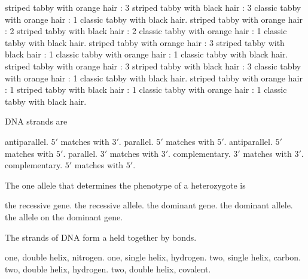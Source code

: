 \begin{choices}
 striped tabby with orange hair : 3 striped tabby with black hair : 3 classic tabby with orange hair : 1 classic tabby with black hair. %
 striped tabby with orange hair : 2 striped tabby with black hair : 2 classic tabby with orange hair : 1 classic tabby with black hair.%
 striped tabby with orange hair : 3 striped tabby with black hair : 1 classic tabby with orange hair : 1 classic tabby with black hair.%
 striped tabby with orange hair : 3 striped tabby with black hair : 3 classic tabby with orange hair : 1 classic tabby with black hair.%
 striped tabby with orange hair : 1 striped tabby with black hair : 1 classic tabby with orange hair : 1 classic tabby with black hair.%
\end{choices}


\question
DNA strands are

\begin{choices}
\correctchoice antiparallel. $5'$ matches with $3'$.%
\choice parallel. $5'$ matches with $5'$.%
\choice antiparallel. $5'$ matches with $5'$.%
\choice parallel. $3'$ matches with $3'$.%
\choice complementary. $3'$ matches with $3'$.%
\choice complementary. $5'$ matches with $5'$.%
\end{choices}


\question
The one allele that determines the phenotype of a heterozygote is

\begin{choices}
\choice the recessive gene.%
\choice the recessive allele.%
\choice the dominant gene.%
\correctchoice the dominant allele.%
\choice the allele on the dominant gene.%
\end{choices}


\question
The \underline{\hspace{2cm}} strands of DNA form a \underline{\hspace{2cm}} held together by \underline{\hspace{2cm}} bonds.

\begin{choices}
\choice one, double helix, nitrogen.%
\choice one, single helix, hydrogen.%
\choice two, single helix, carbon.%
\correctchoice two, double helix, hydrogen.%
\choice two, double helix, covalent.%
\end{choices}


